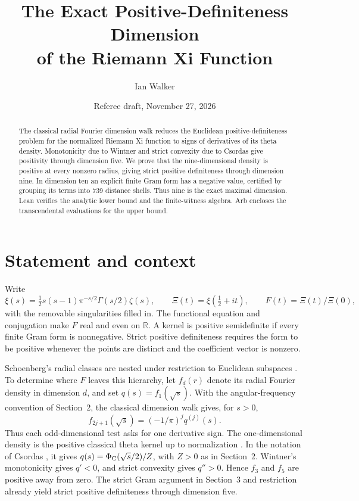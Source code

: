 \documentclass[11pt]{article}
\title{The Exact Positive-Definiteness Dimension\\of the Riemann Xi Function}
\author{Ian Walker}
\date{Referee draft, November 27, 2026}
\newcommand{\R}{\mathbb R}
\begin{document}
\maketitle
\begin{abstract}
The classical radial Fourier dimension walk reduces the Euclidean
positive-definiteness problem for the normalized Riemann Xi function to signs
of derivatives of its theta density. Monotonicity due to Wintner and
strict convexity due to Csordas give positivity through dimension five.
We prove that the nine-dimensional density is positive at every nonzero
radius, giving strict positive definiteness through dimension nine.
In dimension ten an explicit finite Gram form has a negative value,
certified by grouping its terms into 739 distance shells. Thus nine is
the exact maximal dimension. Lean verifies the analytic lower bound and
the finite-witness algebra. Arb encloses the transcendental evaluations
for the upper bound.
\end{abstract}

\section{Statement and context}
Write
\[
\xi(s)=\tfrac12s(s-1)\pi^{-s/2}\Gamma(s/2)\zeta(s),
\qquad \Xi(t)=\xi(\tfrac12+it),
\qquad F(t)=\Xi(t)/\Xi(0),
\]
with the removable singularities filled in. The functional equation and
conjugation make $F$ real and even on $\R$. A kernel is positive
semidefinite if every finite Gram form is nonnegative. Strict positive
definiteness requires the form to be positive whenever the points are
distinct and the coefficient vector is nonzero.

Schoenberg's radial classes are nested under restriction to Euclidean
subspaces \cite{Schoenberg}. To determine where $F$ leaves this hierarchy,
let $f_d(r)$ denote its radial Fourier density in dimension $d$, and set
$q(s)=f_1(\sqrt{s})$. With the angular-frequency convention of Section~2,
the classical dimension walk \cite{GT} gives, for $s>0$,
\[
 f_{2j+1}(\sqrt{s})=(-1/\pi)^j q^{(j)}(s).
\]
Thus each odd-dimensional test asks for one derivative sign. The
one-dimensional density is the positive classical theta kernel up to
normalization \cite{BPY,Nakamura}. In the notation of Csordas
\cite[(2.1)--(2.2)]{Csordas98}, it gives
$q(s)=\Phi_{\rm C}(\sqrt{s}/2)/Z$, with $Z>0$ as in Section~2.
Wintner's monotonicity \cite{Wintner} gives $q'<0$, and strict convexity
\cite[Theorem 2.12]{Csordas98} gives $q''>0$. Hence $f_3$ and $f_5$
are positive away from zero. The strict Gram argument in Section~3
and restriction already yield strict positive definiteness through
dimension five.
\end{document}
